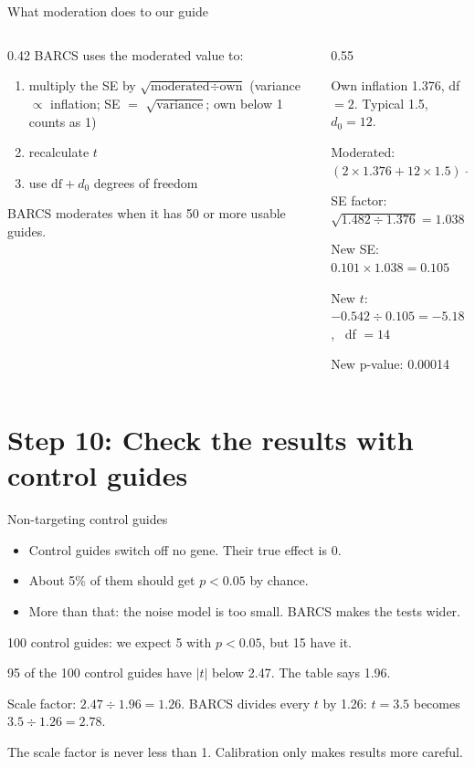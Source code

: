 \documentclass[aspectratio=169,11pt]{beamer}
\begin{document}
\begin{frame}{What moderation does to our guide}
\begin{columns}[T]
\begin{column}{0.42\textwidth}
\small
BARCS uses the moderated value to:
\begin{enumerate}
\item multiply the SE by $\sqrt{\text{moderated} \div \text{own}}$
  (variance $\propto$ inflation; SE $=$ $\sqrt{\text{variance}}$; own
  below 1 counts as 1)
\item recalculate $t$
\item use $\text{df} + d_0$ degrees of freedom
\end{enumerate}
BARCS moderates when it has 50 or more usable guides.
\end{column}
\begin{column}{0.55\textwidth}
\begin{worked}[ 16]
\small
Own inflation 1.376, df $= 2$. Typical 1.5, $d_0 = 12$.

Moderated: $(2 \times 1.376 + 12 \times 1.5) \div 14 = 1.482$

SE factor: $\sqrt{1.482 \div 1.376} = 1.038$

New SE: $0.101 \times 1.038 = 0.105$

New $t$: $-0.542 \div 0.105 = -5.18$, \ df $= 14$

New p-value: 0.00014
\end{worked}
\end{column}
\end{columns}
\end{frame}

\section{Step 10: Check the results with control guides}

\begin{frame}{Non-targeting control guides}
\begin{itemize}
\item \alert{Control guides} switch off no gene. Their true effect is 0.
\item About 5\% of them should get $p < 0.05$ by chance.
\item More than that: the noise model is too small. BARCS makes the tests
  wider.
\end{itemize}
\begin{worked}
\small
100 control guides: we expect 5 with $p < 0.05$, but 15 have it.

95 of the 100 control guides have $|t|$ below 2.47. The table says 1.96.

Scale factor: $2.47 \div 1.96 = 1.26$. BARCS divides every $t$ by 1.26:
$t = 3.5$ becomes $3.5 \div 1.26 = 2.78$.
\end{worked}
\small The scale factor is never less than 1. Calibration only makes results
more careful.
\end{frame}
\end{document}
